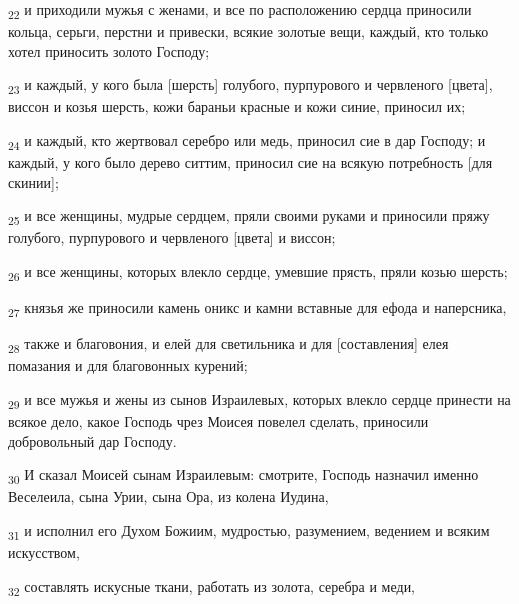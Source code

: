 \begin{tcolorbox}
\textsubscript{22} и приходили мужья с женами, и все по расположению сердца приносили кольца, серьги, перстни и привески, всякие золотые вещи, каждый, кто только хотел приносить золото Господу;
\end{tcolorbox}
\begin{tcolorbox}
\textsubscript{23} и каждый, у кого была [шерсть] голубого, пурпурового и червленого [цвета], виссон и козья шерсть, кожи бараньи красные и кожи синие, приносил их;
\end{tcolorbox}
\begin{tcolorbox}
\textsubscript{24} и каждый, кто жертвовал серебро или медь, приносил сие в дар Господу; и каждый, у кого было дерево ситтим, приносил сие на всякую потребность [для скинии];
\end{tcolorbox}
\begin{tcolorbox}
\textsubscript{25} и все женщины, мудрые сердцем, пряли своими руками и приносили пряжу голубого, пурпурового и червленого [цвета] и виссон;
\end{tcolorbox}
\begin{tcolorbox}
\textsubscript{26} и все женщины, которых влекло сердце, умевшие прясть, пряли козью шерсть;
\end{tcolorbox}
\begin{tcolorbox}
\textsubscript{27} князья же приносили камень оникс и камни вставные для ефода и наперсника,
\end{tcolorbox}
\begin{tcolorbox}
\textsubscript{28} также и благовония, и елей для светильника и для [составления] елея помазания и для благовонных курений;
\end{tcolorbox}
\begin{tcolorbox}
\textsubscript{29} и все мужья и жены из сынов Израилевых, которых влекло сердце принести на всякое дело, какое Господь чрез Моисея повелел сделать, приносили добровольный дар Господу.
\end{tcolorbox}
\begin{tcolorbox}
\textsubscript{30} И сказал Моисей сынам Израилевым: смотрите, Господь назначил именно Веселеила, сына Урии, сына Ора, из колена Иудина,
\end{tcolorbox}
\begin{tcolorbox}
\textsubscript{31} и исполнил его Духом Божиим, мудростью, разумением, ведением и всяким искусством,
\end{tcolorbox}
\begin{tcolorbox}
\textsubscript{32} составлять искусные ткани, работать из золота, серебра и меди,
\end{tcolorbox}
